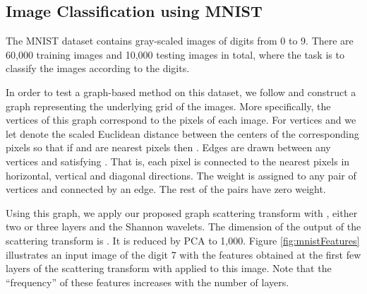 \documentclass{article}
\begin{document}
\subsection{Image Classification using MNIST}\label{sec:mnist}
The MNIST dataset \cite{LecB98} 
contains  gray-scaled images of digits from 0 to 9. 
There are 60,000 training images and 10,000 testing images in total, where the task is to classify the images according to the digits.

In order to test a graph-based method on this dataset, we follow \cite{DefBV16} and construct a graph representing the underlying grid of the images. More specifically, the vertices of this graph correspond to the  pixels of each image. For vertices  and  we let  denote the scaled Euclidean distance between the centers of the corresponding pixels so that if  and  are nearest pixels then . Edges are drawn between any vertices  and  satisfying . That is, each pixel is connected to the nearest pixels in horizontal, vertical and diagonal directions. 
The weight  is assigned to any pair of vertices  and  connected by an edge. The rest of the pairs have zero weight. 

Using this graph, we apply our proposed graph scattering transform with , either two or three layers {and the Shannon wavelets}. {The dimension of the output of the scattering transform is . It is reduced by PCA to 1,000.}
Figure \ref{fig:mnistFeatures} illustrates {an input image of the digit 7 with the features obtained at the first few layers of the scattering transform with  applied to this image. Note that the ``frequency'' of these features} increases with the number of layers.
\end{document}
